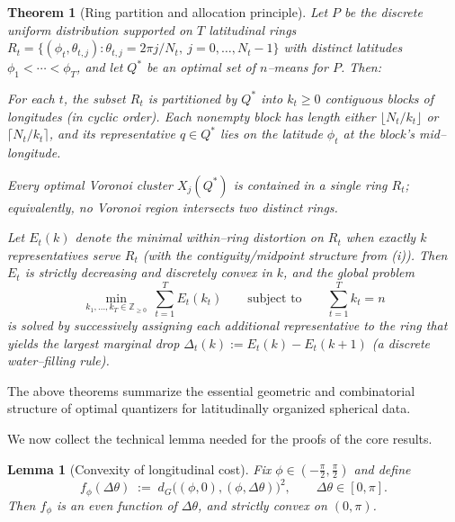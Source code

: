 \documentclass[12pt, reqno]{amsart}
\theoremstyle{plain}
\newtheorem{theorem}[subsection]{Theorem}
\newtheorem{lemma}[subsection]{Lemma}
\theoremstyle{definition}
\begin{document}
\begin{theorem}[Ring partition and allocation principle]\label{thm:ring-allocation}
Let $P$ be the discrete uniform distribution supported on $T$ latitudinal rings 
$R_t=\{(\phi_t,\theta_{t,j}) : \theta_{t,j}=2\pi j/N_t,\ j=0,\dots,N_t-1\}$ with distinct latitudes 
$\phi_1<\cdots<\phi_T$, and let $Q^*$ be an optimal set of $n$--means for $P$. Then:

\smallskip
{}
For each $t$, the subset $R_t$ is partitioned by $Q^*$ into $k_t\ge 0$ contiguous blocks of longitudes (in cyclic order). 
Each nonempty block has length either $\lfloor N_t/k_t\rfloor$ or $\lceil N_t/k_t\rceil$, and its representative $q\in Q^*$ lies on the latitude $\phi_t$ at the block’s mid–longitude.

\smallskip
{}
Every optimal Voronoi cluster $X_j(Q^*)$ is contained in a single ring $R_t$; equivalently, no Voronoi region intersects two distinct rings.

\smallskip
{}
Let $E_t(k)$ denote the minimal within–ring distortion on $R_t$ when exactly $k$ representatives serve $R_t$ 
(with the contiguity/midpoint structure from {\rm (i)}). Then $E_t$ is strictly decreasing and discretely convex in $k$, and the global problem
\[
\min_{k_1,\dots,k_T\in\mathbb{Z}_{\ge 0}}\ \sum_{t=1}^T E_t(k_t)
\qquad\text{subject to}\qquad \sum_{t=1}^T k_t=n
\]
is solved by successively assigning each additional representative to the ring that yields the largest marginal drop 
$\Delta_t(k):=E_t(k)-E_t(k+1)$ (a discrete water–filling rule).
\end{theorem}

The above theorems summarize the essential geometric and combinatorial structure of optimal quantizers for latitudinally organized spherical data.

We now collect the technical lemma needed for the proofs of the core results.
 


\begin{lemma}[Convexity of longitudinal cost] \label{longitudinalcost}
Fix $\phi\in(-\tfrac{\pi}{2},\tfrac{\pi}{2})$ and define
\[
f_\phi(\Delta\theta)\;:=\; d_G\!\big((\phi,0),(\phi,\Delta\theta)\big)^2,
\qquad \Delta\theta\in[0,\pi].
\]
Then $f_\phi$ is an even function of $\Delta\theta$, and strictly convex on $(0,\pi)$.
\end{lemma}
\end{document}
